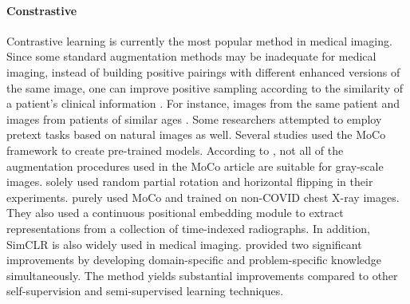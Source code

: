 \documentclass[11pt,titlepage,openright]{book}
\begin{document}
\paragraph{\textbf{Constrastive}} Contrastive learning is currently the most popular method in medical imaging. Since some standard augmentation methods may be inadequate for medical imaging, instead of building positive pairings with different enhanced versions of the same image, one can improve positive sampling according to the similarity of a patient's clinical information \citep{huang2023self}. For instance, images from the same patient \citep{azizi2021big} and images from patients of similar ages \citep{dufumier2021contrastive}. Some researchers attempted to employ pretext tasks based on natural images as well. Several studies \citep{sowrirajan2021moco, vu2021medaug, chen2021momentum, sriram2021covid} used the MoCo \citep{he2020momentum} framework to create pre-trained models. According to \cite{sowrirajan2021moco}, not all of the augmentation procedures used in the MoCo article are suitable for gray-scale images. \cite{sowrirajan2021moco} solely used random partial rotation and horizontal flipping in their experiments. \cite{sriram2021covid} purely used MoCo \citep{he2020momentum} and trained on non-COVID chest X-ray images. They also used a continuous positional embedding module to extract representations from a collection of time-indexed radiographs. In addition, SimCLR \citep{chen2020simple} is also widely used in medical imaging. \cite{chaitanya2020contrastive} provided two significant improvements by developing domain-specific and problem-specific knowledge simultaneously. The method yields substantial improvements compared
to other self-supervision and semi-supervised learning techniques.
\end{document}
